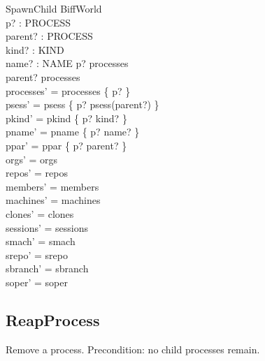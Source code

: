 \documentclass[a4paper,10pt,fleqn]{article}
\begin{document}
\begin{schema}{SpawnChild}
  \Delta BiffWorld \\
  p? : PROCESS \\
  parent? : PROCESS \\
  kind? : KIND \\
  name? : NAME
  \where
  p? \notin processes \\
  parent? \in processes \\
  processes' = processes \cup \{ p? \} \\
  psess' = psess \cup \{ p? \mapsto psess(parent?) \} \\
  pkind' = pkind \cup \{ p? \mapsto kind? \} \\
  pname' = pname \cup \{ p? \mapsto name? \} \\
  ppar' = ppar \cup \{ p? \mapsto parent? \} \\
  orgs' = orgs \\
  repos' = repos \\
  members' = members \\
  machines' = machines \\
  clones' = clones \\
  sessions' = sessions \\
  smach' = smach \\
  srepo' = srepo \\
  sbranch' = sbranch \\
  soper' = soper
\end{schema}

\subsection{ReapProcess}

Remove a process.  Precondition: no child processes remain.
\end{document}
